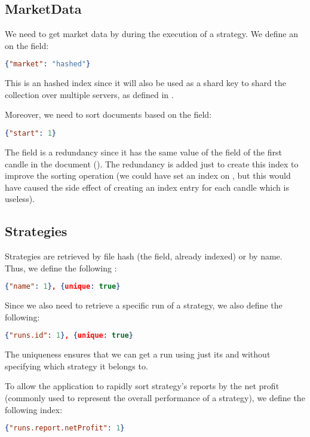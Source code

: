 \subsection{MarketData}

We need to get market data by  during the execution of a strategy.
We define an  on the  field:

\begin{lstlisting}[language=json]
{"market": "hashed"}
\end{lstlisting}

This is an hashed index since it will also be used as a shard key to shard the
collection over multiple servers, as defined in .

Moreover, we need to sort documents based on the  field:

\begin{lstlisting}[language=json]
{"start": 1}
\end{lstlisting}

The  field is a redundancy since it has the same value of the
 field of the first candle in the document (). The
redundancy is added just to create this index to improve the sorting operation
(we could have set an index on , but this would have caused the
side effect of creating an index entry for each candle which is useless).

\subsection{Strategies}

Strategies are retrieved by file hash (the  field, already indexed)
or by name. Thus, we define the following :

\begin{lstlisting}[language=json]
{"name": 1}, {unique: true}
\end{lstlisting}

Since we also need to retrieve a specific run of a strategy, we also define the
following:

\begin{lstlisting}[language=json]
{"runs.id": 1}, {unique: true}
\end{lstlisting}

The uniqueness ensures that we can get a run using just its  and
without specifying which strategy it belongs to.

To allow the application to rapidly sort strategy's reports by the net profit
(commonly used to represent the overall performance of a strategy), we define
the following index:

\begin{lstlisting}[language=json]
{"runs.report.netProfit": 1}
\end{lstlisting}

